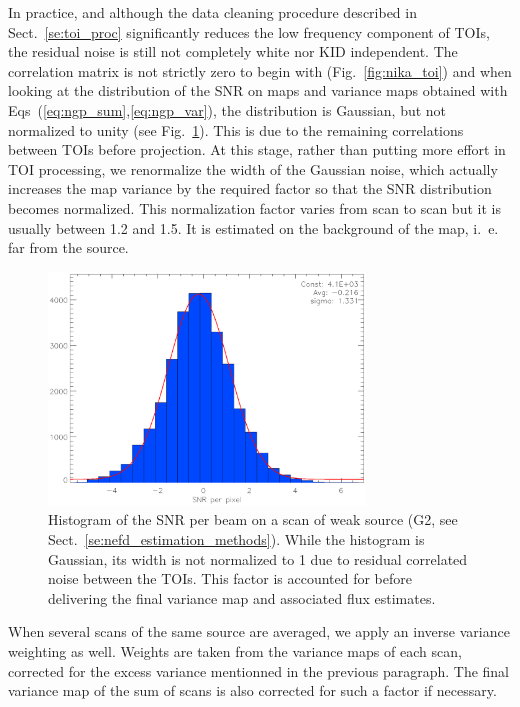 In practice, and although the data cleaning procedure described in
Sect.~\ref{se:toi_proc} significantly reduces the low frequency component of
TOIs, the residual noise is still not completely white nor KID independent. The
correlation matrix is not strictly zero to begin with (Fig.~\ref{fig:nika_toi})
and when looking at the distribution of the SNR on maps and variance maps
obtained with Eqs~(\ref{eq:ngp_sum},\ref{eq:ngp_var}), the distribution is
Gaussian, but not normalized to unity (see Fig.~\ref{fig:sigma_boost}). This is
due to the remaining correlations between TOIs before projection. At this stage,
rather than putting more effort in TOI processing, we renormalize the width of
the Gaussian noise, which actually increases the map variance by the required factor
so that the SNR distribution becomes normalized. This normalization factor
varies from scan to scan but it is usually between 1.2 and 1.5. It is estimated on
the background of the map, i.~e. far from the source.

\begin{figure}[ht!]
\begin{center}
\includegraphics[clip, angle=0, scale=1, width=0.75\textwidth]{Figures/sigma_boost.eps}
\caption[Distribution of the SNR per beam]{Histogram of the SNR per beam on a scan of weak source (G2, see
  Sect.~\ref{se:nefd_estimation_methods}). While the histogram is Gaussian, its
  width is not normalized to 1 due to residual correlated noise between the
  TOIs. This factor is accounted for before delivering the final variance map
  and associated flux estimates.}
\label{fig:sigma_boost}
\end{center}
\end{figure}

When several scans of the same source are averaged, we apply an inverse
variance weighting as well. Weights are taken from the variance maps of each scan,
corrected for the excess variance mentionned in the previous paragraph. The
final variance map of the sum of scans is also corrected for such a factor if necessary.

